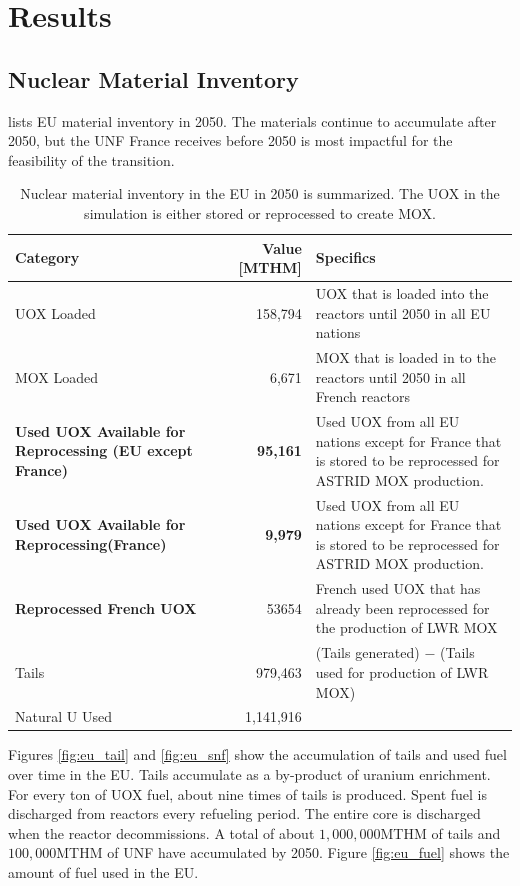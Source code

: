 \section{Results}

\subsection{Nuclear Material Inventory}

 lists \gls{EU} material inventory in 2050.
The materials continue to accumulate after 2050, but the
\gls{UNF} France receives before 2050 is most impactful for the
feasibility of the transition.


\begin{table}[h]
	\centering
	\caption{Nuclear material inventory in the \gls{EU} in 2050 is
                  summarized. The \gls{UOX} in the simulation is either stored or reprocessed to create \gls{MOX}.}

		\begin{tabular}{lrl}
			\hline
			\textbf{Category} & \textbf{Value [MTHM]} & Specifics \\ \hline
			UOX Loaded  & 158,794 & UOX that is loaded into the reactors until 2050 in all EU nations \\ 
			MOX Loaded  & 6,671  & MOX that is loaded in to the reactors until 2050 in all French reactors \\ 
			\textbf{Used UOX Available for Reprocessing (EU except France)}  & \textbf{95,161}  & Used UOX from all EU nations except for France that is stored to be reprocessed for ASTRID MOX production.\\
			\textbf{Used UOX Available for Reprocessing(France)} & \textbf{9,979}  & Used UOX from all EU nations except for France that is stored to be reprocessed for ASTRID MOX production. \\
			\textbf{Reprocessed French UOX} & 53654 & French used UOX that has already been reprocessed for the production of LWR MOX \\
			Tails  & 979,463  & (Tails generated) $-$ (Tails used for production of LWR MOX) \\ 
			Natural U Used  & 1,141,916  & \\ \hline
		\end{tabular}
		
		\label{tab:sim_result1}
\end {table}
\FloatBarrier


Figures \ref{fig:eu_tail} and \ref{fig:eu_snf} show the 
accumulation of tails and used fuel over time in the \gls{EU}.
Tails accumulate as a by-product of uranium enrichment. For every
ton of \gls{UOX} fuel, about nine times of tails is produced. 
Spent fuel is discharged from reactors every refueling period.
The entire core is discharged when the reactor decommissions.
A total of about $1,000,000$MTHM of tails and $100,000$MTHM of
\gls{UNF} have accumulated by 2050.
Figure \ref{fig:eu_fuel} shows the amount of fuel used in the \gls{EU}.


